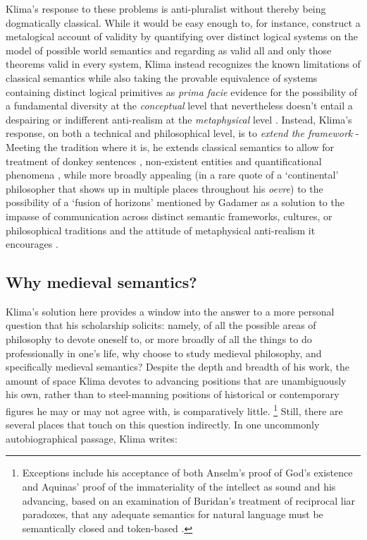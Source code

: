 \documentclass[]{article}
\begin{document}
Klima's response to these problems is anti-pluralist 
without thereby being dogmatically classical. 
While it would be easy enough to, for instance, 
construct a metalogical account of validity by quantifying over distinct logical systems on the model of possible world semantics and regarding as valid all and only those theorems valid in every system, 
Klima instead recognizes the known limitations of classical semantics 
while also taking the provable equivalence of systems containing distinct logical primitives
as \emph{prima facie} evidence for the possibility of a fundamental diversity at the \emph{conceptual} level 
that nevertheless doesn't entail a despairing or indifferent anti-realism at the \emph{metaphysical} level \autocite{Klima2012}.
Instead, Klima's response, on both a technical and philosophical level, 
is to \emph{extend the framework} -
Meeting the tradition where it is, he extends classical semantics to allow for treatment of 
donkey sentences \autocite{Klima1988,Klima2010}, 
non-existent entities \autocite{Klima2001}
and quantificational phenomena \autocite{KlimaSandu1990},
while more broadly appealing (in a rare quote of a `continental' philosopher that shows up in multiple places throughout his \emph{oevre}) 
to the possibility of a `fusion of horizons' mentioned by Gadamer 
as a solution to the impasse of communication across distinct semantic frameworks, cultures, or philosophical traditions 
and the attitude of metaphysical anti-realism it encourages \autocite{Klima2000,Klima2009a}.

\subsection{Why medieval semantics?}
Klima's solution here provides a window into the answer to a more personal question that his scholarship solicits: 
namely, of all the possible areas of philosophy to devote oneself to, 
or more broadly of all the things to do professionally in one's life, 
why choose to study medieval philosophy, 
and specifically medieval semantics?
Despite the depth and breadth of his work, 
the amount of space Klima devotes to advancing positions that are unambiguously his own, 
rather than to steel-manning positions of historical or contemporary figures 
he may or may not agree with,
is comparatively little.
\footnote{Exceptions include his acceptance of both Anselm's proof of God's existence and Aquinas' proof of the immateriality of the intellect as sound \autocite{Klima2000,Klima2009a} 
	and his advancing, 
	based on an examination of Buridan's treatment of reciprocal liar paradoxes, 
	that any adequate semantics for natural language must be semantically closed and token-based \autocite{Klima2004}.} 
Still, there are several places that touch on this question indirectly. 
In one uncommonly autobiographical passage, Klima writes: 
\end{document}
